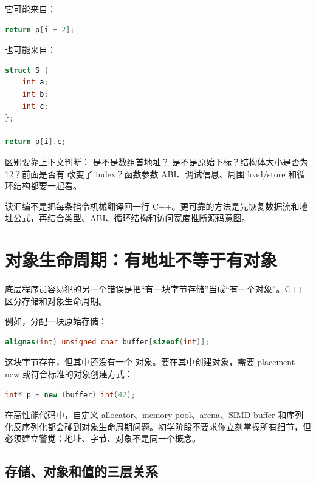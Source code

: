 它可能来自：

\begin{lstlisting}[language=C++]
return p[i + 2];
\end{lstlisting}

也可能来自：

\begin{lstlisting}[language=C++]
struct S {
    int a;
    int b;
    int c;
};

return p[i].c;
\end{lstlisting}

区别要靠上下文判断： 是不是数组首地址？ 是不是原始下标？结构体大小是否为 12？前面是否有  改变了 index？函数参数 ABI、调试信息、周围 load/store 和循环结构都要一起看。

\begin{mentalmodel}
读汇编不是把每条指令机械翻译回一行 C++。更可靠的方法是先恢复数据流和地址公式，再结合类型、ABI、循环结构和访问宽度推断源码意图。
\end{mentalmodel}

\section{对象生命周期：有地址不等于有对象}

底层程序员容易犯的另一个错误是把“有一块字节存储”当成“有一个对象”。C++ 区分存储和对象生命周期。

例如，分配一块原始存储：

\begin{lstlisting}[language=C++]
alignas(int) unsigned char buffer[sizeof(int)];
\end{lstlisting}

这块字节存在，但其中还没有一个  对象。要在其中创建对象，需要 placement new 或符合标准的对象创建方式：

\begin{lstlisting}[language=C++]
int* p = new (buffer) int(42);
\end{lstlisting}

在高性能代码中，自定义 allocator、memory pool、arena、SIMD buffer 和序列化反序列化都会碰到对象生命周期问题。初学阶段不要求你立刻掌握所有细节，但必须建立警觉：地址、字节、对象不是同一个概念。

\subsection{存储、对象和值的三层关系}

